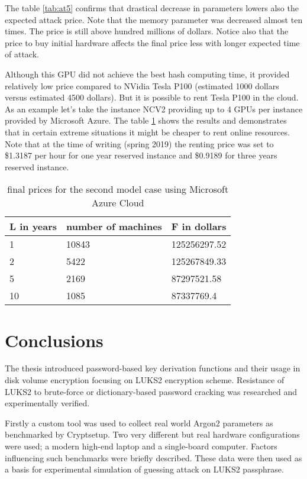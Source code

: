 \documentclass[nolof]{fithesis3}
\begin{document}
The table \ref{tab:at5} confirms that drastical decrease in parameters lowers also the expected attack price. Note that the memory parameter was decreased almost ten times. The price is still above hundred millions of dollars. Notice also that the price to buy initial hardware affects the final price less with longer expected time of attack.

Although this GPU did not achieve the best hash computing time, it provided relatively low price compared to NVidia Tesla P100 (estimated 1000  dollars versus estimated 4500 dollars). But it is possible to rent Tesla P100 in the cloud. As an example let's take the instance NCV2 providing up to 4 GPUs per instance provided by Microsoft Azure. The table \ref{tab:at6} shows the results and demonstrates that in certain extreme situations it might be cheaper to rent online resources. Note that at the time of writing (spring 2019) the renting price was set to \$1.3187 per hour for one year reserved instance and \$0.9189 for three years reserved instance.


\noindent
\begin{table}
\caption{final prices for the second model case using Microsoft Azure Cloud}
\label{tab:at6}
\begin{tabularx}{\textwidth}{| X | X | X |}
\hline
L  in years & number of machines & F in dollars\\
\hline
1 & 10843 & 125256297.52\\
\hline
2 & 5422 & 125267849.33\\
\hline
5 & 2169 & 87297521.58\\
\hline
10 & 1085 & 87337769.4\\
\hline
\end{tabularx}
\end{table}

\chapter{Conclusions}
The thesis introduced password-based key derivation functions and their usage in disk volume encryption focusing on LUKS2 encryption scheme. Resistance of LUKS2 to brute-force or dictionary-based password cracking was researched and experimentally verified.

Firstly a custom tool was used to collect real world Argon2 parameters as benchmarked by Cryptsetup. Two very different but real hardware configurations were used; a modern high-end laptop and a single-board computer. Factors influencing such benchmarks were briefly described. These data were then used as a basis for experimental simulation of guessing attack on LUKS2 passphrase.
\end{document}
